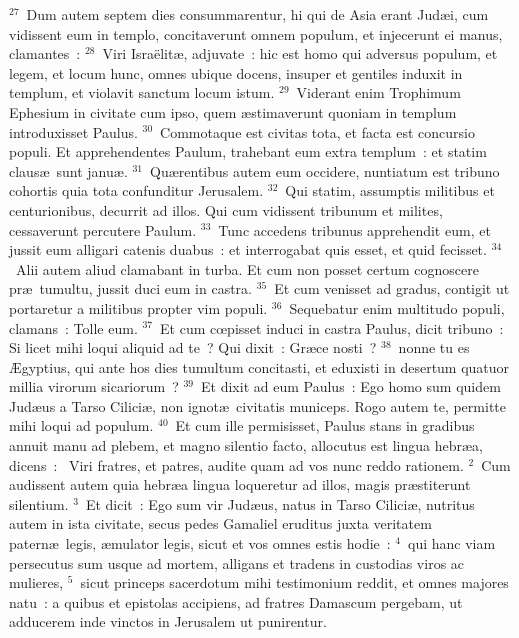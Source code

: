 ${}^{27}$~Dum autem septem dies consummarentur, hi qui de Asia erant Jud\ae i, cum vidissent eum in templo, concitaverunt omnem populum, et injecerunt ei manus, clamantes~:
${}^{28}$~Viri Isra\"elit\ae , adjuvate~: hic est homo qui adversus populum, et legem, et locum hunc, omnes ubique docens, insuper et gentiles induxit in templum, et violavit sanctum locum istum.
${}^{29}$~Viderant enim Trophimum Ephesium in civitate cum ipso, quem \ae stimaverunt quoniam in templum introduxisset Paulus.
${}^{30}$~Commotaque est civitas tota, et facta est concursio populi. Et apprehendentes Paulum, trahebant eum extra templum~: et statim claus\ae\ sunt janu\ae .
${}^{31}$~Qu\ae rentibus autem eum occidere, nuntiatum est tribuno cohortis quia tota confunditur Jerusalem.
${}^{32}$~Qui statim, assumptis militibus et centurionibus, decurrit ad illos. Qui cum vidissent tribunum et milites, cessaverunt percutere Paulum.
${}^{33}$~Tunc accedens tribunus apprehendit eum, et jussit eum alligari catenis duabus~: et interrogabat quis esset, et quid fecisset.
${}^{34}$~Alii autem aliud clamabant in turba. Et cum non posset certum cognoscere pr\ae\ tumultu, jussit duci eum in castra.
${}^{35}$~Et cum venisset ad gradus, contigit ut portaretur a militibus propter vim populi.
${}^{36}$~Sequebatur enim multitudo populi, clamans~: Tolle eum.
${}^{37}$~Et cum cœpisset induci in castra Paulus, dicit tribuno~: Si licet mihi loqui aliquid ad te~? Qui dixit~: Gr\ae ce nosti~?
${}^{38}$~nonne tu es \AE gyptius, qui ante hos dies tumultum concitasti, et eduxisti in desertum quatuor millia virorum sicariorum~?
${}^{39}$~Et dixit ad eum Paulus~: Ego homo sum quidem Jud\ae us a Tarso Cilici\ae , non ignot\ae\ civitatis municeps. Rogo autem te, permitte mihi loqui ad populum.
${}^{40}$~Et cum ille permisisset, Paulus stans in gradibus annuit manu ad plebem, et magno silentio facto, allocutus est lingua hebr\ae a, dicens~:
~\lettrine[lines=10,image=true,loversize=0.05,lraise=-0.03]{V}{}iri fratres, et patres, audite quam ad vos nunc reddo rationem.
${}^{2}$~Cum audissent autem quia hebr\ae a lingua loqueretur ad illos, magis pr\ae stiterunt silentium.
${}^{3}$~Et dicit~: Ego sum vir Jud\ae us, natus in Tarso Cilici\ae , nutritus autem in ista civitate, secus pedes Gamaliel eruditus juxta veritatem patern\ae\ legis, \ae mulator legis, sicut et vos omnes estis hodie~:
${}^{4}$~qui hanc viam persecutus sum usque ad mortem, alligans et tradens in custodias viros ac mulieres,
${}^{5}$~sicut princeps sacerdotum mihi testimonium reddit, et omnes majores natu~: a quibus et epistolas accipiens, ad fratres Damascum pergebam, ut adducerem inde vinctos in Jerusalem ut punirentur.
